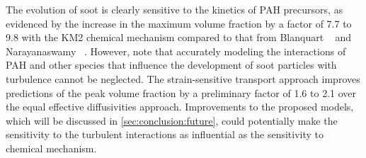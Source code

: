 The evolution of soot is clearly sensitive to the kinetics of PAH precursors, as evidenced by the increase in the maximum volume fraction by a factor of 7.7 to 9.8 with the KM2 chemical mechanism compared to that from Blanquart \etal~\cite{blanquart2009} and Narayanaswamy \etal~\cite{narayanaswamy2010}. However, note that accurately modeling the interactions of PAH and other species that influence the development of soot particles with turbulence cannot be neglected. The strain-sensitive transport approach improves predictions of the peak volume fraction by a preliminary factor of 1.6 to 2.1 over the equal effective diffusivities approach. Improvements to the proposed models, which will be discussed in \cref{sec:conclusion:future}, could potentially make the sensitivity to the turbulent interactions as influential as the sensitivity to chemical mechanism.



